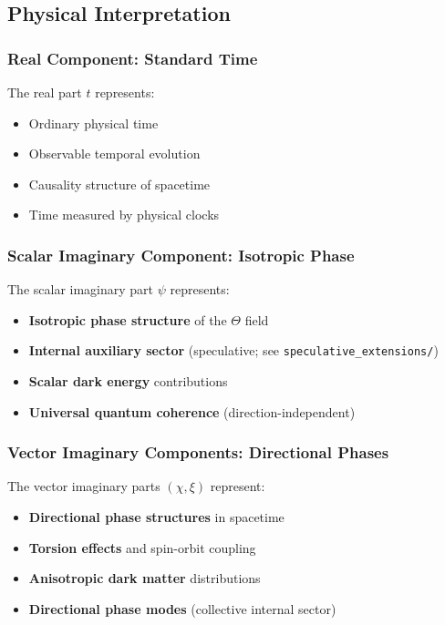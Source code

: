 \subsection{Physical Interpretation}

\subsubsection{Real Component: Standard Time}

The real part $t$ represents:
\begin{itemize}
    \item Ordinary physical time
    \item Observable temporal evolution
    \item Causality structure of spacetime
    \item Time measured by physical clocks
\end{itemize}

\subsubsection{Scalar Imaginary Component: Isotropic Phase}

The scalar imaginary part $\psi$ represents:
\begin{itemize}
    \item \textbf{Isotropic phase structure} of the $\Theta$ field
    \item \textbf{Internal auxiliary sector} (speculative; see \texttt{speculative\_extensions/})
    \item \textbf{Scalar dark energy} contributions
    \item \textbf{Universal quantum coherence} (direction-independent)
\end{itemize}

\subsubsection{Vector Imaginary Components: Directional Phases}

The vector imaginary parts $(\chi, \xi)$ represent:
\begin{itemize}
    \item \textbf{Directional phase structures} in spacetime
    \item \textbf{Torsion effects} and spin-orbit coupling
    \item \textbf{Anisotropic dark matter} distributions
    \item \textbf{Directional phase modes} (collective internal sector)
\end{itemize}

